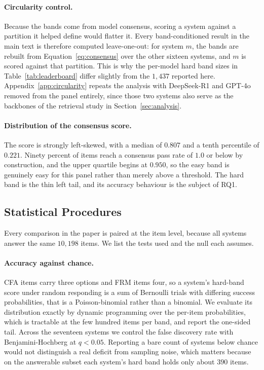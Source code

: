 \paragraph{Circularity control.}
Because the bands come from model consensus, scoring a system against a partition it helped
define would flatter it. Every band-conditioned result in the main text is therefore computed
leave-one-out: for system $m$, the bands are rebuilt from Equation~\ref{eq:consensus} over the
other sixteen systems, and $m$ is scored against that partition. This is why the per-model hard
band sizes in Table~\ref{tab:leaderboard} differ slightly from the $1{,}437$ reported here.
Appendix~\ref{app:circularity} repeats the analysis with DeepSeek-R1 and GPT-4o removed from the
panel entirely, since those two systems also serve as the backbones of the retrieval study in
Section~\ref{sec:analysis}.

\paragraph{Distribution of the consensus score.}
The score is strongly left-skewed, with a median of $0.807$ and a tenth percentile of $0.221$.
Ninety percent of items reach a consensus pass rate of $1.0$ or below by construction, and the
upper quartile begins at $0.950$, so the easy band is genuinely easy for this panel rather than
merely above a threshold. The hard band is the thin left tail, and its accuracy behaviour is the
subject of RQ1.

\subsection{Statistical Procedures}
\label{app:tests}

Every comparison in the paper is paired at the item level, because all systems answer the same
$10{,}198$ items. We list the tests used and the null each assumes.

\paragraph{Accuracy against chance.}
CFA items carry three options and FRM items four, so a system's hard-band score under random
responding is a sum of Bernoulli trials with differing success probabilities, that is a
Poisson-binomial rather than a binomial. We evaluate its distribution exactly by dynamic
programming over the per-item probabilities, which is tractable at the few hundred items per
band, and report the one-sided tail. Across the seventeen systems we control the false discovery
rate with Benjamini-Hochberg at $q<0.05$. Reporting a bare count of systems below chance would
not distinguish a real deficit from sampling noise, which matters because on the answerable
subset each system's hard band holds only about $390$ items.

